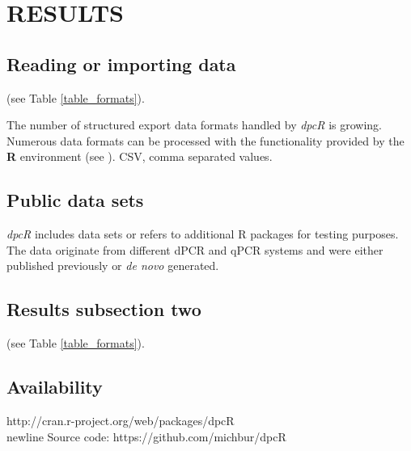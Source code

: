 \documentclass[a4,center,fleqn]{NAR}
\begin{document}
\section{RESULTS}

\subsection{Reading or importing data}

(see Table \ref{table_formats}).

\begin{table}[b]
{The number of structured export data formats handled by \textit{dpcR} is growing. Numerous data 
formats can be processed with the functionality provided by the \textbf{R} 
environment (see \cite{rodiger_r_2015}). CSV, comma separated values.
} \end{table}

\subsection{Public data sets}

\textit{dpcR} includes data sets or refers to additional R packages for testing 
purposes. The data originate from different dPCR and qPCR systems and were 
either published previously \cite{whale_comparison_2012, 
rodiger_chippcr_2015,rodiger_r_2015} or \textit{de novo} generated.


\subsection{Results subsection two}

(see Table \ref{table_formats}).


\subsection{Availability}

http://cran.r-project.org/web/packages/dpcR\\newline
Source code: https://github.com/michbur/dpcR\
\end{document}
